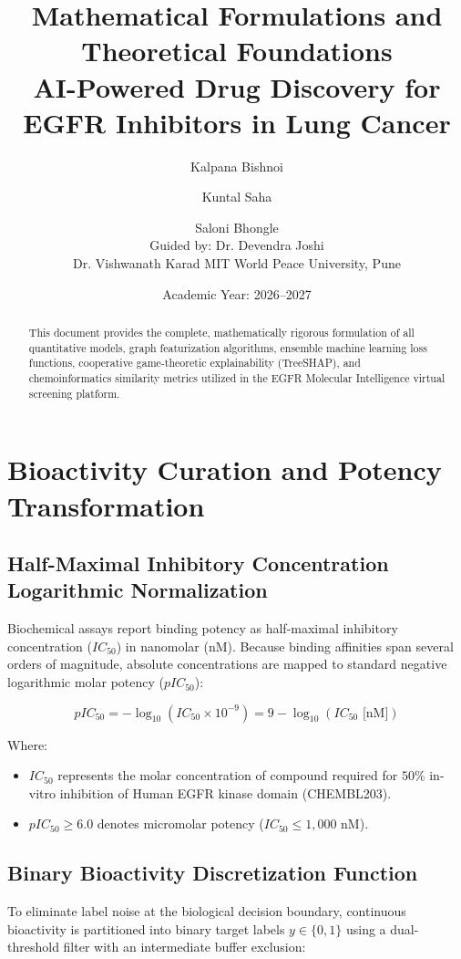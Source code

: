 \documentclass[11pt,a4paper]{article}
\title{\textbf{Mathematical Formulations and Theoretical Foundations}\\
\large AI-Powered Drug Discovery for EGFR Inhibitors in Lung Cancer}
\author{Kalpana Bishnoi \and Kuntal Saha \and Saloni Bhongle\\
\small Guided by: Dr. Devendra Joshi\\
\small Dr. Vishwanath Karad MIT World Peace University, Pune}
\date{Academic Year: 2026--2027}
\begin{document}
\maketitle

\begin{abstract}
This document provides the complete, mathematically rigorous formulation of all quantitative models, graph featurization algorithms, ensemble machine learning loss functions, cooperative game-theoretic explainability (TreeSHAP), and chemoinformatics similarity metrics utilized in the EGFR Molecular Intelligence virtual screening platform.
\end{abstract}

\tableofcontents
\newpage

\section{Bioactivity Curation and Potency Transformation}

\subsection{Half-Maximal Inhibitory Concentration Logarithmic Normalization}
Biochemical assays report binding potency as half-maximal inhibitory concentration ($IC_{50}$) in nanomolar ($\text{nM}$). Because binding affinities span several orders of magnitude, absolute concentrations are mapped to standard negative logarithmic molar potency ($pIC_{50}$):

\begin{equation}
\label{eq:pic50}
pIC_{50} = -\log_{10}\left( IC_{50} \times 10^{-9} \right) = 9 - \log_{10}\left( IC_{50}\text{ [nM]} \right)
\end{equation}

\noindent Where:
\begin{itemize}
    \item $IC_{50}$ represents the molar concentration of compound required for $50\%$ in-vitro inhibition of Human EGFR kinase domain (CHEMBL203).
    \item $pIC_{50} \ge 6.0$ denotes micromolar potency ($IC_{50} \le 1{,}000\text{ nM}$).
\end{itemize}

\subsection{Binary Bioactivity Discretization Function}
To eliminate label noise at the biological decision boundary, continuous bioactivity is partitioned into binary target labels $y \in \{0, 1\}$ using a dual-threshold filter with an intermediate buffer exclusion:
\end{document}
